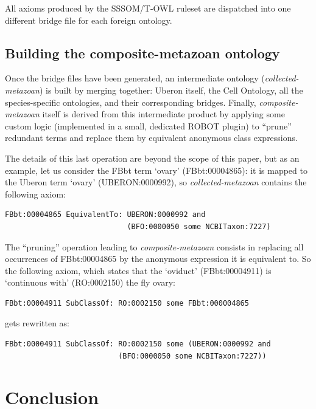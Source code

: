 \documentclass{ceurart}
\def\term#1{`#1'}
\def\curie#1{\textsf{#1}}
\begin{document}
All axioms produced by the SSSOM/T-OWL ruleset are dispatched into one
different bridge file for each foreign ontology.

\subsection{Building the composite-metazoan ontology}

Once the bridge files have been generated, an intermediate ontology
(\emph{collected-metazoan}) is built by merging together: Uberon itself,
the Cell Ontology, all the species-specific ontologies, and their
corresponding bridges. Finally, \emph{composite-metazoan} itself is
derived from this intermediate product by applying some custom logic
(implemented in a small, dedicated ROBOT plugin) to ``prune'' redundant
terms and replace them by equivalent anonymous class expressions.

The details of this last operation are beyond the scope of this paper,
but as an example, let us consider the FBbt term \term{ovary}
(\curie{FBbt:00004865}): it is mapped to the Uberon term \term{ovary}
(\curie{UBERON:0000992}), so \emph{collected-metazoan} contains the
following axiom:

\begin{lstlisting}
FBbt:00004865 EquivalentTo: UBERON:0000992 and
                            (BFO:0000050 some NCBITaxon:7227)
\end{lstlisting}

The ``pruning'' operation leading to \emph{composite-metazoan} consists
in replacing all occurrences of \curie{FBbt:00004865} by the anonymous
expression it is equivalent to. So the following axiom, which states
that the \term{oviduct} (\curie{FBbt:00004911}) is \term{continuous
with} (\curie{RO:0002150}) the fly ovary:

\begin{lstlisting}
FBbt:00004911 SubClassOf: RO:0002150 some FBbt:000004865
\end{lstlisting}

gets rewritten as:

\begin{lstlisting}
FBbt:00004911 SubClassOf: RO:0002150 some (UBERON:0000992 and
                          (BFO:0000050 some NCBITaxon:7227))
\end{lstlisting}

\section{Conclusion}
\end{document}
